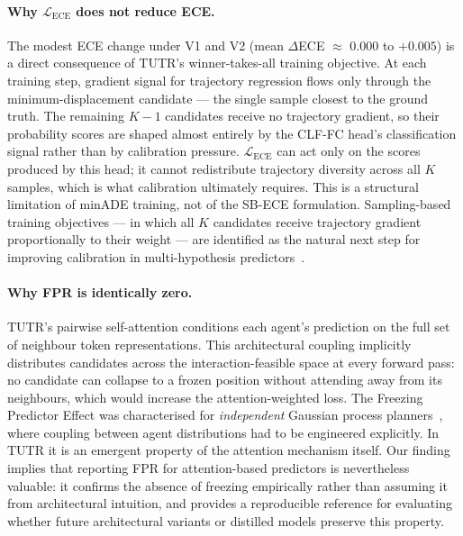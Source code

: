 \documentclass{article}
\begin{document}
\paragraph{Why \(\mathcal{L}_{\text{ECE}}\) does not reduce ECE.}
The modest ECE change under V1 and V2 (mean \(\Delta\)ECE \(\approx\) 0.000
to \(+0.005\)) is a direct consequence of TUTR's winner-takes-all training
objective. At each training step, gradient signal for trajectory regression
flows only through the minimum-displacement candidate --- the single sample
closest to the ground truth. The remaining \(K-1\) candidates receive no
trajectory gradient, so their probability scores are shaped almost entirely
by the CLF-FC head's classification signal rather than by calibration pressure.
\(\mathcal{L}_{\text{ECE}}\) can act only on the scores produced by this head;
it cannot redistribute trajectory diversity across all \(K\) samples, which is
what calibration ultimately requires. This is a structural limitation of minADE
training, not of the SB-ECE formulation. Sampling-based training objectives ---
in which all \(K\) candidates receive trajectory gradient proportionally to
their weight --- are identified as the natural next step for improving
calibration in multi-hypothesis predictors~\cite{karandikar2021soft}.
 
\paragraph{Why FPR is identically zero.}
TUTR's pairwise self-attention conditions each agent's prediction on the full
set of neighbour token representations. This architectural coupling implicitly
distributes candidates across the interaction-feasible space at every forward
pass: no candidate can collapse to a frozen position without attending away
from its neighbours, which would increase the attention-weighted loss. The
Freezing Predictor Effect was characterised for \emph{independent} Gaussian
process planners~\cite{trautman2010unfreezing}, where coupling between agent
distributions had to be engineered explicitly. In TUTR it is an emergent
property of the attention mechanism itself. Our finding implies that reporting
FPR for attention-based predictors is nevertheless valuable: it confirms the
absence of freezing empirically rather than assuming it from architectural
intuition, and provides a reproducible reference for evaluating whether future
architectural variants or distilled models preserve this property.
 
\end{document}
